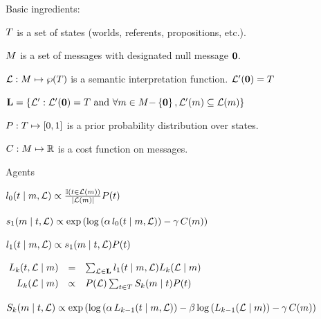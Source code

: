 \documentclass{article}
\begin{document}
\begin{examples}
\item Basic ingredients:
  \begin{examples}
  \item $\States$ is a set of states (worlds, referents, propositions, etc.).
  \item $\Messages$ is a set of messages with designated null message $\nullmsg$.
  \item $\Lex: \Messages \mapsto \wp(\States)$ is a semantic interpretation function. $\Lex'(\nullmsg) = \States$
  \item $\LexSet = \set{\Lex' : \Lex'(\nullmsg) = \States \text{ and } \forall \msg \in \Messages{-}\set{\nullmsg}, \Lex'(\msg) \subseteq \Lex(\msg)}$
  \item $\Prior : \States \mapsto [0,1]$ is a prior probability
    distribution over states.    
  \item $\Costs : \Messages \mapsto \Reals$ is a cost function on messages.
  \end{examples}

\item Agents
  \begin{examples}
  \item\label{l0}%
    $\listenerZero(\state \given \msg, \Lex) \propto
    \frac{\mathbb{I}(\state \in \Lex(\msg))}{|\Lex(\msg)|}
    \Prior(\state)$

  \item\label{s1}%
    $\speakerOne(\msg \given \state, \Lex) \propto
    \exp
    \left(
      \log\left(\alpha\,\listenerZero(\state \given \msg, \Lex) \right)
      - 
      \gamma\,\Costs(\msg)
    \right)$
    
  \item\label{l1}%
    $\listenerOne(\state \given \msg, \Lex) \propto 
    \speakerOne(\msg \given \state, \Lex)
    \Prior(\state)$

  \item\label{Lk}%
    \setlength{\arraycolsep}{2pt}%
    $\mspace{-4mu}\begin{array}[t]{r c l}
      \ListenerK(\state, \Lex \given \msg) 
      &=&
      \sum_{\Lex \in \LexSet} \listenerOne(\state \given \msg, \Lex) \ListenerK(\Lex \given \msg) 
      \\[1ex]
      \ListenerK(\Lex \given \msg) 
      &\propto& 
      \Prior(\Lex) \sum_{\state\in\States} \SpeakerK(\msg \given \state)\Prior(\state)
    \end{array}$
    
  \item\label{Sk}%
    $\SpeakerK(\msg \given \state, \Lex) \propto 
    \exp
    \left(
      \log
      \left(\alpha\,\ListenerK[k-1](\state \given \msg, \Lex)\right)
      - 
      \beta \log\left(\ListenerK[k-1](\Lex\given\msg)\right)
      -
      \gamma\,\Costs(\msg)
    \right)$
  \end{examples}
\end{examples}
\end{document}
